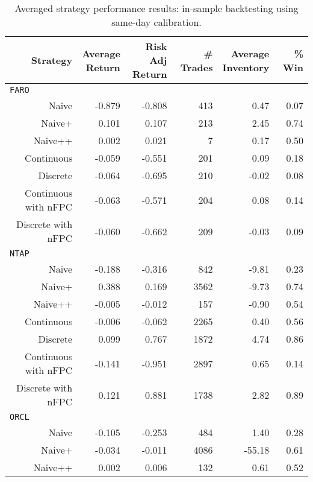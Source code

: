 \begin{table}
\centering
{}
\caption[In-sample backtesting performance using same-day calibration]{Averaged strategy performance results: in-sample backtesting using same-day calibration.}\label{tbl:IS_sameday}
\setlength{\tabcolsep}{9pt}
\begin{tabular}{@{} *{6}{r} @{}}
\toprule
Strategy & \cellbreak{t}{r}{Average \\ Return} & \cellbreak{t}{r}{Risk Adj \\ Return} & \cellbreak{t}{r}{\# Trades \\ \hphantom{Risk Adj}} & \cellbreak{t}{r}{Average \\ Inventory} & \cellbreak{t}{r}{\% Win \\ \hphantom{Risk Adj}} \\
\midrule
\multicolumn{6}{l}{\texttt{FARO}} \\
Naive & -0.879 & -0.808 & 413 & 0.47 & 0.07  \\ 
Naive+ & 0.101 & 0.107 & 213 & 2.45 & 0.74  \\ 
Naive++ & 0.002 & 0.021 & 7 & 0.17 & 0.50  \\ 
Continuous & -0.059 & -0.551 & 201 & 0.09 & 0.18  \\ 
Discrete & -0.064 & -0.695 & 210 & -0.02 & 0.08  \\ 
Continuous with nFPC & -0.063 & -0.571 & 204 & 0.08 & 0.14  \\ 
Discrete with nFPC & -0.060 & -0.662 & 209 & -0.03 & 0.09  \\[2ex]
\multicolumn{6}{l}{\texttt{NTAP}} \\
Naive & -0.188 & -0.316 & 842 & -9.81 & 0.23 \\ 
Naive+ & 0.388 & 0.169 & 3562 & -9.73 & 0.74 \\ 
Naive++ & -0.005 & -0.012 & 157 & -0.90 & 0.54  \\ 
Continuous & -0.006 & -0.062 & 2265 & 0.40 & 0.56  \\ 
Discrete & 0.099 & 0.767 & 1872 & 4.74 & 0.86  \\ 
Continuous with nFPC & -0.141 & -0.951 & 2897 & 0.65 & 0.14 \\ 
Discrete with nFPC & 0.121 & 0.881 & 1738 & 2.82 & 0.89  \\[2ex]
\multicolumn{6}{l}{\texttt{ORCL}} \\
Naive & -0.105 & -0.253 & 484 & 1.40 & 0.28  \\ 
Naive+ & -0.034 & -0.011 & 4086 & -55.18 & 0.61 \\ 
Naive++ & 0.002 & 0.006 & 132 & 0.61 & 0.52 \\ 

\end{tabular}
\end{table}
